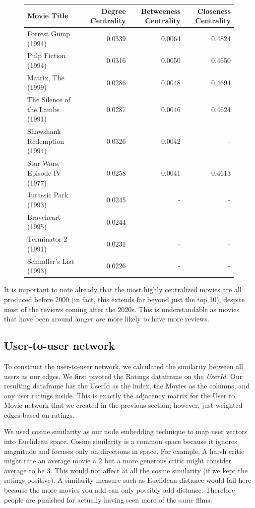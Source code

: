 \documentclass[12pt]{article}
\numberwithin{equation}{section}
\begin{document}
\begin{figure}[h!]
    \begin{tabular}{|p{6cm}|r|r|r|}
        \hline
        \textbf{Movie Title} & \multicolumn{1}{p{2.5cm}|}{\textbf{Degree Centrality}} & \multicolumn{1}{p{3cm}|}{\textbf{Betweeness Centrality}} & \multicolumn{1}{p{3cm}|}{\textbf{Closeness Centrality}} \\
        \hline
        Forrest Gump (1994) & 0.0339 & 0.0064 & 0.4824 \\
        Pulp Fiction (1994) & 0.0316 & 0.0050 & 0.4650 \\
        Matrix, The (1999) & 0.0286 & 0.0048 & 0.4694 \\
        The Silence of the Lambs (1991) & 0.0287 & 0.0046 & 0.4624 \\
        Shawshank Redemption (1994) & 0.0326 & 0.0042 & - \\
        Star Wars: Episode IV (1977) & 0.0258 & 0.0041 & 0.4613 \\
        Jurassic Park (1993) & 0.0245 & - & - \\
        Braveheart (1995) & 0.0244 & - & - \\
        Terminator 2 (1991) & 0.0231 & - & - \\
        Schindler's List (1993) & 0.0226 & - & - \\
        \hline
    \end{tabular}
\end{figure}

It is important to note already that the most highly centralized movies are all produced before 2000 (in fact, this extends far beyond just the top 10), despite most of the reviews coming after the 2020s. This is understandable as movies that have been around longer are more likely to have more reviews.

\subsection{User-to-user network}

To construct the user-to-user network, we calculated the similarity between all users as our edges.  We first pivoted the Ratings dataframe on the \textit{UserId}. Our resulting dataframe has the UserId as the index, the Movies as the columns, and any user ratings inside. This is exactly the adjacency matrix for the User to Movie network that we created in the previous section; however, just weighted edges based on ratings.

We used cosine similarity as our node embedding technique to map user vectors into Euclidean space. Cosine similarity is a common space because it ignores magnitude and focuses only on directions in space. For example, A harsh critic might rate an average movie a 2 but a more generous critic might consider average to be 3. This would not affect at all the cosine similarity (if we kept the ratings positive). A similarity measure such as Euclidean distance would fail here because the more movies you add can only possibly add distance. Therefore people are punished for actually having seen more of the same films.
\end{document}
